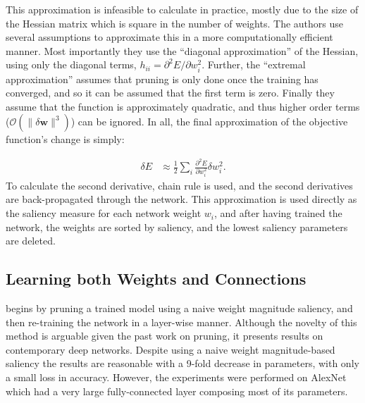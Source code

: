 \documentclass[thesis]{subfiles}
\begin{document}
    This approximation is infeasible to calculate in practice, mostly due to the size of the Hessian matrix which is square in the number of weights. The authors use several assumptions to approximate this in a more computationally efficient manner. Most importantly they use the ``diagonal approximation'' of the Hessian, using only the diagonal terms, $h_{ii}=\partial^2 E / \partial w_i^2$. Further, the ``extremal approximation'' assumes that pruning is only done once the training has converged, and so it can be assumed that the first term is zero. Finally they assume that the function is approximately quadratic, and thus higher order terms (\ie $\mathcal{O}(\|\delta \mathbf{w}\|^3)$) can be ignored. In all, the final approximation of the objective function's change is simply:

    \begin{align}
       \delta E &\approx \frac{1}{2} \sum_i \frac{\partial^2 E}{\partial w_i^2} \delta w_i^2.
    \end{align}
    To calculate the second derivative, chain rule is used, and the second derivatives are back-propagated through the network. This approximation is used directly as the saliency measure for each network weight $w_i$, and after having trained the network, the weights are sorted by saliency, and the lowest saliency parameters are deleted.
	
    

	\subsection{Learning both Weights and Connections}
	\citet{han2015learning} begins by pruning a trained model using a naive weight magnitude saliency, and then re-training the network in a layer-wise manner. Although the novelty of this method is arguable given the past work on pruning, it presents results on contemporary deep networks. Despite using a naive weight magnitude-based saliency the results are reasonable with a 9-fold decrease in parameters, with only a small loss in accuracy. However, the experiments were performed on AlexNet which had a very large fully-connected layer composing most of its parameters.
\end{document}
